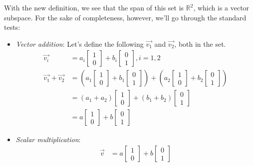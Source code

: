 \begin{enumerate}
{	With the new definition, we see that the span of this set is $\mathbb{R}^2$, which is a vector subspace. For the sake of completeness, however, we'll go through the standard tests:
	\begin{itemize}
		\item \textit{Vector addition}: Let's define the following $\vec{v_1}$ and $\vec{v_2}$, both in the set.
		\begin{align*}
			\vec{v_i} &= a_i\begin{bmatrix}1\\0\end{bmatrix} + b_i\begin{bmatrix}0\\1\end{bmatrix}, i=1, 2\\
			\vec{v_1} + \vec{v_2} &= \left(a_1\begin{bmatrix}1\\0\end{bmatrix} + b_1\begin{bmatrix}0\\1\end{bmatrix}\right) + \left(a_2\begin{bmatrix}1\\0\end{bmatrix} + b_2\begin{bmatrix}0\\1\end{bmatrix}\right)\\
				&= \left(a_1 + a_2\right)\begin{bmatrix}1\\0\end{bmatrix} + \left(b_1 + b_2\right)\begin{bmatrix}0\\1\end{bmatrix}\\
				&= a\begin{bmatrix}1\\0\end{bmatrix} + b\begin{bmatrix}0\\1\end{bmatrix}
		\end{align*}
		\item \textit{Scalar multiplication}:
		\begin{align*}
			\vec{v} &= a\begin{bmatrix}1\\0\end{bmatrix} + b\begin{bmatrix}0\\1\end{bmatrix}\\

\end{align*}
\end{itemize}}
\end{enumerate}
